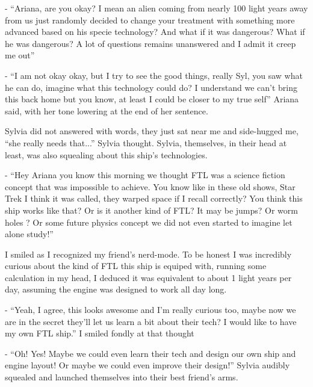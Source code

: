 \documentclass[hidelinks,12pt,a4paper]{book}
\begin{document}
- “Ariana, are you okay? I mean an alien coming from nearly 100 light years away from us just randomly decided to 
change your treatment with something more advanced based on his specie technology? And what if it was dangerous? 
What if he was dangerous? A lot of questions remains unanswered and I admit it creep me out”\par
\bigskip

- “I am not okay okay, but I try to see the good things, really Syl, you saw what he can do, imagine what this technology 
could do? I understand we can't bring this back home but you know, at least I could be closer to my true self” 
Ariana said, with her tone lowering at the end of her sentence.\par
\bigskip

Sylvia did not answered with words, they just sat near me and side-hugged me, “she really needs that...” 
Sylvia thought. Sylvia, themselves, in their head at least, was also squealing about this ship's technologies.\par
\bigskip

- “Hey Ariana you know this morning we thought FTL was a science fiction concept that was impossible to achieve. 
You know like in these old shows, Star Trek I think it was called, they warped space if I recall correctly? You think 
this ship works like that? Or is it another kind of FTL? It may be jumps? Or worm holes ? Or some future physics concept
 we did not even started to imagine let alone study!”\par
 \bigskip

I smiled as I recognized my friend's nerd-mode. To be honest I was incredibly curious about the kind of FTL this ship is 
equiped with, running some calculation in my head, I deduced it was equivalent to about 1 light years per day, assuming 
the engine was designed to work all day long.\par
\bigskip

- “Yeah, I agree, this looks awesome and I'm really curious too, maybe now we are in the secret they'll let us learn a bit 
about their tech? I would like to have my own FTL ship.” I smiled fondly at that thought\par
\bigskip

- “Oh! Yes! Maybe we could even learn their tech and design our own ship and engine layout! Or maybe we could even improve 
their design!” Sylvia audibly squealed and launched themselves into their best friend's arms.\par
\bigskip
\end{document}

